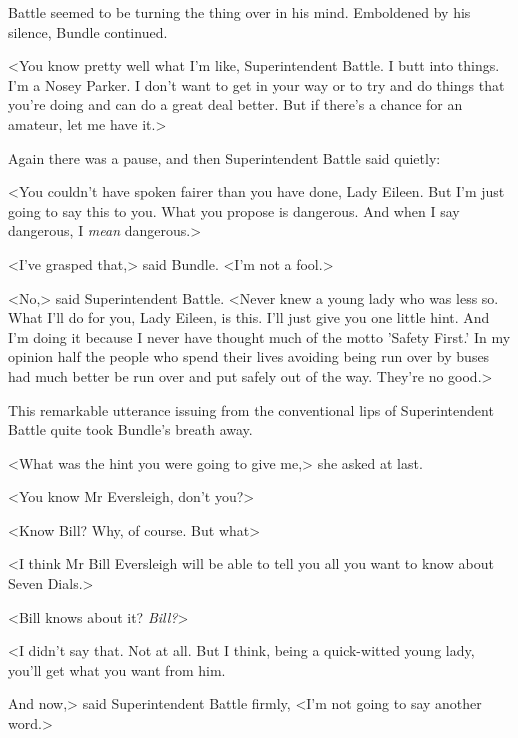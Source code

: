 Battle seemed to be turning the thing over in his mind. Emboldened by his silence, Bundle continued.

<You know pretty well what I'm like, Superintendent Battle. I butt into things. I'm a Nosey Parker. I don't want to get in your way or to try and do things that you're doing and can do a great deal better. But if there's a chance for an amateur, let me have it.>

Again there was a pause, and then Superintendent Battle said quietly:

<You couldn't have spoken fairer than you have done, Lady Eileen. But I'm just going to say this to you. What you propose is dangerous. And when I say dangerous, I \emph{mean} dangerous.>

<I've grasped that,> said Bundle. <I'm not a fool.>

<No,> said Superintendent Battle. <Never knew a young lady who was less so. What I'll do for you, Lady Eileen, is this. I'll just give you one little hint. And I'm doing it because I never have thought much of the motto 'Safety First.' In my opinion half the people who spend their lives avoiding being run over by buses had much better be run over and put safely out of the way. They're no good.>

This remarkable utterance issuing from the conventional lips of Superintendent Battle quite took Bundle's breath away.

<What was the hint you were going to give me,> she asked at last.

<You know Mr Eversleigh, don't you?>

<Know Bill? Why, of course. But what\longdash>

<I think Mr Bill Eversleigh will be able to tell you all you want to know about Seven Dials.>

<Bill knows about it? \emph{Bill?}>

<I didn't say that. Not at all. But I think, being a quick-witted young lady, you'll get what you want from him.

And now,> said Superintendent Battle firmly, <I'm not going to say another word.>
